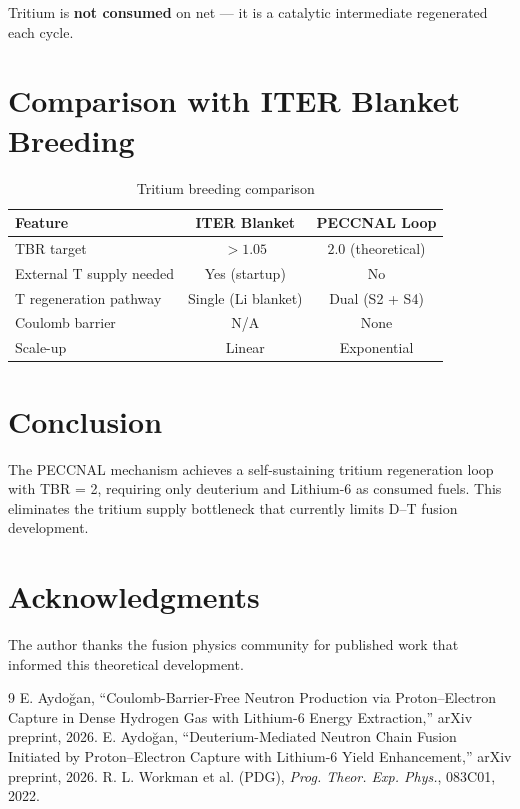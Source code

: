 \documentclass[12pt,a4paper]{article}
\begin{document}
Tritium is \textbf{not consumed} on net — it is a catalytic
intermediate regenerated each cycle.

\section{Comparison with ITER Blanket Breeding}

\begin{table}[h!]
\centering
\caption{Tritium breeding comparison}
\vspace{0.5em}
\begin{tabular}{lcc}
\toprule
\textbf{Feature} & \textbf{ITER Blanket} & \textbf{PECCNAL Loop} \\
\midrule
TBR target & $>1.05$ & $2.0$ (theoretical) \\
External T supply needed & Yes (startup) & No \\
T regeneration pathway & Single (Li blanket) & Dual (S2 + S4) \\
Coulomb barrier & N/A & None \\
Scale-up & Linear & Exponential \\
\bottomrule
\end{tabular}
\end{table}

\section{Conclusion}
The PECCNAL mechanism achieves a self-sustaining tritium
regeneration loop with TBR = 2, requiring only deuterium and
Lithium-6 as consumed fuels. This eliminates the tritium supply
bottleneck that currently limits D--T fusion development.

\section*{Acknowledgments}
The author thanks the fusion physics community for published work
that informed this theoretical development.

\begin{thebibliography}{9}
 E. Aydoğan, ``Coulomb-Barrier-Free Neutron Production via Proton--Electron Capture in Dense Hydrogen Gas with Lithium-6 Energy Extraction,'' arXiv preprint, 2026.
 E. Aydoğan, ``Deuterium-Mediated Neutron Chain Fusion Initiated by Proton--Electron Capture with Lithium-6 Yield Enhancement,'' arXiv preprint, 2026.
 R. L. Workman et al. (PDG), \textit{Prog. Theor. Exp. Phys.}, 083C01, 2022.
\end{thebibliography}
\end{document}
